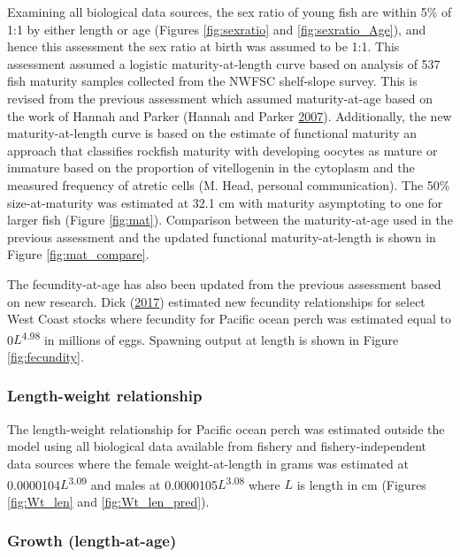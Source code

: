 \documentclass[12pt,]{article}
\begin{document}
Examining all biological data sources, the sex ratio of young fish are
within 5\% of 1:1 by either length or age (Figures \ref{fig:sexratio}
and \ref{fig:sexratio_Age}), and hence this assessment the sex ratio at
birth was assumed to be 1:1. This assessment assumed a logistic
maturity-at-length curve based on analysis of 537 fish maturity samples
collected from the NWFSC shelf-slope survey. This is revised from the
previous assessment which assumed maturity-at-age based on the work of
Hannah and Parker (Hannah and Parker
\protect\hyperlink{ref-hannah_age-modulated_2007}{2007}). Additionally,
the new maturity-at-length curve is based on the estimate of functional
maturity an approach that classifies rockfish maturity with developing
oocytes as mature or immature based on the proportion of vitellogenin in
the cytoplasm and the measured frequency of atretic cells (M. Head,
personal communication). The 50\% size-at-maturity was estimated at 32.1
cm with maturity asymptoting to one for larger fish (Figure
\ref{fig:mat}). Comparison between the maturity-at-age used in the
previous assessment and the updated functional maturity-at-length is
shown in Figure \ref{fig:mat_compare}.

The fecundity-at-age has also been updated from the previous assessment
based on new research. Dick
(\protect\hyperlink{ref-dick_meta-analysis_2017}{2017}) estimated new
fecundity relationships for select West Coast stocks where fecundity for
Pacific ocean perch was estimated equal to 0\(L\)\textsuperscript{4.98}
in millions of eggs. Spawning output at length is shown in Figure
\ref{fig:fecundity}.

\subsubsection{Length-weight
relationship}\label{length-weight-relationship}

The length-weight relationship for Pacific ocean perch was estimated
outside the model using all biological data available from fishery and
fishery-independent data sources where the female weight-at-length in
grams was estimated at 0.0000104\(L\)\textsuperscript{3.09} and males at
0.0000105\(L\)\textsuperscript{3.08} where \(L\) is length in cm
(Figures \ref{fig:Wt_len} and \ref{fig:Wt_len_pred}).

\subsubsection{Growth (length-at-age)}\label{growth-length-at-age}
\end{document}
